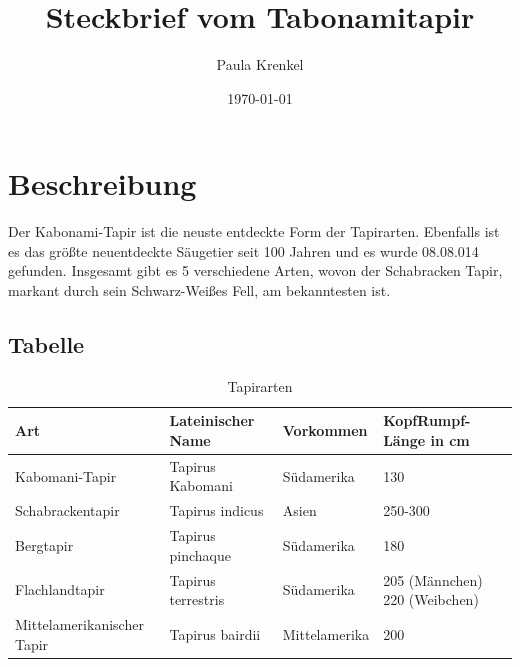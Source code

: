 \documentclass[12pt,a4paper,bibliography=totoc]{scrreprt}
\author{Paula Krenkel}
\title{Steckbrief vom Tabonamitapir}
\date{\today}
\begin{document}
\maketitle


\tableofcontents  \thispagestyle{plain}


\cleardoublepage
{} %
\listoffigures \thispagestyle{plain}


\cleardoublepage
{} %
\listoftables


\chapter{Beschreibung}
Der Kabonami-Tapir ist die neuste entdeckte Form der Tapirarten. Ebenfalls ist es das größte neuentdeckte Säugetier seit 100 Jahren und es wurde 08.08.014 gefunden. Insgesamt gibt es 5 verschiedene Arten, wovon der Schabracken Tapir, markant durch sein Schwarz-Weißes Fell, am bekanntesten ist. 

\section{Tabelle}

\begin{table}[h]
\centering
\caption{Tapirarten}
\label{tapirtabl}
\begin{tabular}{|p{3.5cm}|p{3.5cm}|p{2.5cm}|p{3.5cm}|}
\hline
Art  		 				 & Lateinischer Name  & Vorkommen     & KopfRumpf-Länge in cm 	  	 \\ \hline
Kabomani-Tapir         	  	& Tapirus Kabomani   & Südamerika    & 130          				    \\ \hline
Schabrackentapir        	 & Tapirus indicus    & Asien         & 250-300  						\\ \hline
Bergtapir                	& Tapirus pinchaque  & Südamerika    & 180          					\\ \hline
Flachlandtapir           	& Tapirus terrestris & Südamerika    & 205 (Männchen)  220 (Weibchen) 	\\ \hline	Mittelamerikanischer Tapir 	& Tapirus bairdii    & Mittelamerika & 200 								\\ \hline
\end{tabular}
\end{table} \FloatBarrier
\end{document}
